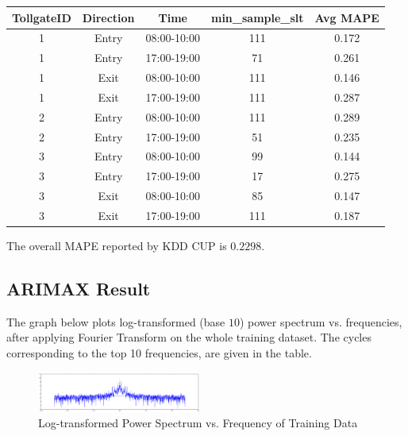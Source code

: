 \documentclass[journal, letterpaper]{IEEEtran}
\begin{document}
\begin{table}[ht]
\centering %
\begin{tabular}{c |c |c |c |c} %
\hline\hline %
TollgateID & Direction & Time & min\_sample\_slt & Avg MAPE \\ %
\hline %
1 & Entry & 08:00-10:00 & 111 & 0.172 \\ %
\hline
1 & Entry & 17:00-19:00 & 71 & 0.261 \\
\hline
1 & Exit & 08:00-10:00 & 111 & 0.146 \\
\hline
1 & Exit & 17:00-19:00 & 111 & 0.287 \\
\hline
2 & Entry & 08:00-10:00 & 111 & 0.289 \\ 
\hline
2 & Entry & 17:00-19:00 & 51 & 0.235 \\
\hline
3 & Entry & 08:00-10:00 & 99 & 0.144 \\ 
\hline
3 & Entry & 17:00-19:00 & 17 & 0.275 \\
\hline
3 & Exit & 08:00-10:00 & 85 & 0.147 \\
\hline
3 & Exit & 17:00-19:00 & 111 & 0.187 \\
\hline %
\end{tabular}
\label{table:nonlin} %
\end{table}

The overall MAPE reported by KDD CUP is $0.2298$.

\subsection{ARIMAX Result}
The graph below plots log-transformed (base $10$) power spectrum vs. frequencies, after applying Fourier Transform on the whole training dataset. The cycles corresponding to the top 10 frequencies, are given in the table.

\begin{figure} [H]
  \centering
  \includegraphics[width=0.48\textwidth]{FT.png}
  \caption{Log-transformed Power Spectrum vs. Frequency of Training Data}
  \label{fig:16}
\end{figure}
\end{document}
